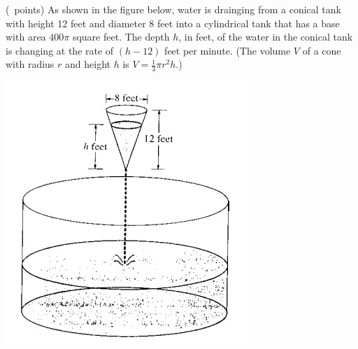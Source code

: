 \begin{questions}
\question (\totalpoints\ points) As shown in the figure below, water
     is drainging from a conical tank with height 12 feet and diameter
     8 feet into a cylindrical tank that has a base with area $400\pi$
     square feet. The depth $h$, in feet, of the water in the conical
     tank is changing at the rate of $(h - 12)$ feet per minute. (The
     volume $V$ of a cone with radius $r$ and height $h$ is $V
     = \frac{1}{3}\pi r^2 h$.)

     \begin{center}
         \includegraphics{BCII-3.png}
     \end{center}

\end{questions}
